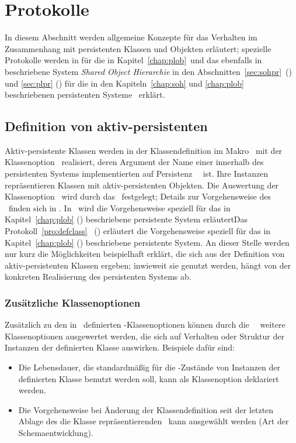 \section{Protokolle}
%
In diesem Abschnitt werden allgemeine Konzepte f\"{u}r das Verhalten im
Zusammenhang mit persistenten Klassen und Objekten erl\"{a}utert;
spezielle Protokolle werden \ifbericht
in \cite[]{bib:ki94a} f\"{u}r die in
Kapitel~\ref{chap:plob}\ und das ebenfalls in
\cite[]{bib:ki94a} beschriebene System {\em Shared Object
Hierarchie\/} \soh%
\else
in den Abschnitten~\ref{sec:sohpr}\ (\citepage{\pageref{sec:sohpr}}) und
\ref{sec:plpr} (\citepage{\pageref{sec:plpr}}) f\"{u}r die
in den Kapiteln~\ref{chap:soh} und \ref{chap:plob}\ %
beschriebenen persistenten Systeme%
\fi\ erkl\"{a}rt.
%
\subsection{Definition von aktiv-persistenten \protect\cls[n]}
%
%
Aktiv-persistente Klassen werden in der Klassendefinition im Makro
\ mit der Klassenoption \ realisiert,
deren Argument der Name einer innerhalb des persistenten Systems
implementierten auf Persistenz \spc[n]\ \clsmc\ ist. Ihre Instanzen
repr\"{a}sentieren Klassen mit aktiv-persistenten Objekten. Die
Auswertung der Klassenoption \ wird durch das
\mop\ festgelegt; Details zur Vorgehensweise des \mop\ finden sich in
\cite{bib:pa91b}. \ifbericht In \cite[]{bib:ki94a}\ wird
die Vorgehensweise speziell f\"{u}r das in Kapitel~\ref{chap:plob}
(\citepage{\pageref{chap:plob}}) beschriebene persistente System
erl\"{a}utert\else Das Protokoll~\ref{pro:defclass}
\ (\citepage{\pageref{pro:defclass}}) erl\"{a}utert die 
Vorgehensweise speziell f\"{u}r das in Kapitel~\ref{chap:plob}
(\citepage{\pageref{chap:plob}}) beschriebene persistente
System\fi. An dieser Stelle werden nur kurz die M\"{o}glichkeiten
beispielhaft erkl\"{a}rt, die sich aus der Definition von
aktiv-persistenten Klassen ergeben; inwieweit sie genutzt werden,
h\"{a}ngt von der konkreten Realisierung des persistenten Systems ab.
%
\subsubsection{Zus\"{a}tzliche Klassenoptionen}
%
Zus\"{a}tzlich zu den in \ definierten
\std-Klassenoptionen k\"{o}nnen durch die \spc\ \clsmc\ weitere
Klassenoptionen ausgewertet werden, die sich auf Verhalten oder
Struktur der Instanzen der definierten Klasse auswirken. Beispiele
daf\"{u}r sind:
\begin{itemize}
%
\item Die Lebensdauer, die standardm\"{a}\ss{}ig f\"{u}r die
\Slt\/-Zust\"{a}nde von Instanzen der definierten Klasse benutzt werden
soll, kann als Klassenoption deklariert werden.
%
\item Die Vorgehensweise bei \"{A}nderung der Klassendefinition seit der
letzten Ablage des die Klasse repr\"{a}sentierenden \clsmo[es]\ kann
ausgew\"{a}hlt werden (Art der Schemaentwicklung).
%
\end{itemize}
%
